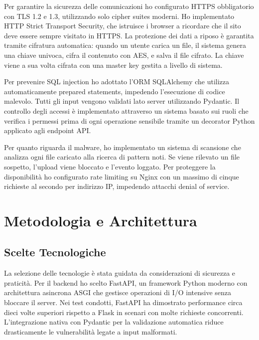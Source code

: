 \documentclass[12pt, a4paper]{article}
\begin{document}
Per garantire la sicurezza delle comunicazioni ho configurato HTTPS obbligatorio con TLS 1.2 e 1.3, utilizzando solo cipher suites moderni. Ho implementato HTTP Strict Transport Security, che istruisce i browser a ricordare che il sito deve essere sempre visitato in HTTPS. La protezione dei dati a riposo è garantita tramite cifratura automatica: quando un utente carica un file, il sistema genera una chiave univoca, cifra il contenuto con AES, e salva il file cifrato. La chiave viene a sua volta cifrata con una master key gestita a livello di sistema.

Per prevenire SQL injection ho adottato l'ORM SQLAlchemy che utilizza automaticamente prepared statements, impedendo l'esecuzione di codice malevolo. Tutti gli input vengono validati lato server utilizzando Pydantic. Il controllo degli accessi è implementato attraverso un sistema basato sui ruoli che verifica i permessi prima di ogni operazione sensibile tramite un decorator Python applicato agli endpoint API.

Per quanto riguarda il malware, ho implementato un sistema di scansione che analizza ogni file caricato alla ricerca di pattern noti. Se viene rilevato un file sospetto, l'upload viene bloccato e l'evento loggato. Per proteggere la disponibilità ho configurato rate limiting su Nginx con un massimo di cinque richieste al secondo per indirizzo IP, impedendo attacchi denial of service.

\newpage

\section{Metodologia e Architettura}

\subsection{Scelte Tecnologiche}

La selezione delle tecnologie è stata guidata da considerazioni di sicurezza e praticità. Per il backend ho scelto FastAPI, un framework Python moderno con architettura asincrona ASGI che gestisce operazioni di I/O intensive senza bloccare il server. Nei test condotti, FastAPI ha dimostrato performance circa dieci volte superiori rispetto a Flask in scenari con molte richieste concorrenti. L'integrazione nativa con Pydantic per la validazione automatica riduce drasticamente le vulnerabilità legate a input malformati.
\end{document}
